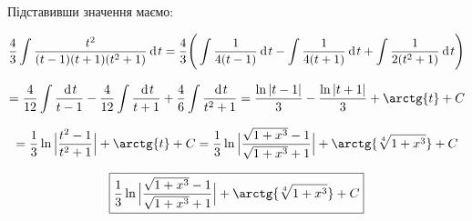 Підставивши значення маємо:

$$
  \dfrac{4}{3} \int \dfrac{t^2}{(t-1)(t+1)(t^2+1)} \hspace{2pt}\text{d}\hspace{1pt}{t}
= \dfrac{4}{3} \Bigg(\int \dfrac{1}{4(t-1)}\hspace{2pt}\text{d}\hspace{1pt}{t} - \int \dfrac{1}{4(t+1)}\hspace{2pt}\text{d}\hspace{1pt}{t} + \int \dfrac{1}{2(t^2+1)} \hspace{2pt}\text{d}\hspace{1pt}{t} \Bigg)
$$

$$
= \dfrac{4}{12} \int \dfrac{\d{t}}{t-1} - \dfrac{4}{12} \int \dfrac{\d{t}}{t+1} + \dfrac{4}{6} \int \dfrac{\d{t}}{t^2+1} = \dfrac{\ln{|t-1|}}{3} - \dfrac{\ln{|t+1|}}{3} + \arctg{t} + C
$$

$$
  = \dfrac{1}{3} \ln{\Big| \dfrac{t^2-1}{t^2+1}\Big|} + \arctg{t} + C
  = \dfrac{1}{3} \ln{\Big| \dfrac{\sqrt{1+x^3}-1}{\sqrt{1+x^3}+1}\Big|} + \arctg{\sqrt[4]{1+x^3}} + C
$$

$$
 \boxed{\dfrac{1}{3} \ln{\Big| \dfrac{\sqrt{1+x^3}-1}{\sqrt{1+x^3}+1}\Big|} + \arctg{\sqrt[4]{1+x^3}} + C}
$$
